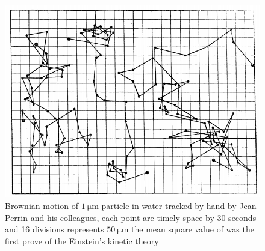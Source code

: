\begin{figure}[h]
	\centering
	\includegraphics[scale=0.6]{02_body/chapter1/image/graph_perrin.png}
	\caption{Brownian motion of $1 ~ \mathrm{\mu m}$ particle in water tracked by hand by Jean Perrin and his colleagues, each point are timely space by 30 seconds and 16 divisions represents $50 ~ \mathrm{\mu m}$  the mean square value of was the first prove of the Einstein's kinetic theory}
	\label{fig:Perrin_Brownian}
\end{figure}

